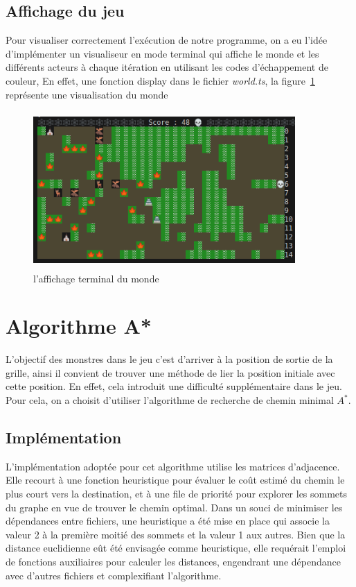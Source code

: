 \documentclass[11pt]{article}
\begin{document}
        \subsection{Affichage du jeu} 
    Pour visualiser correctement l’exécution de notre programme, on a eu l’idée d’implémenter un visualiseur en mode terminal qui affiche le monde et les différents acteurs à chaque itération en utilisant les codes d'échappement de couleur, En effet, une fonction display dans le fichier \textit{world.ts}, la figure~\ref{fig: display } représente une visualisation du monde \\
     \begin{figure}[h]
                \centering
                \includegraphics[height = 6cm, width = 10cm]{WorldFigure.png}
                \caption{l'affichage terminal du monde} 
                \label{fig: display } 
            \end{figure}
    \section{Algorithme A*}
        L'objectif des monstres dans le jeu c'est d'arriver à la position de sortie de la grille, ainsi il convient de trouver une méthode de lier la position initiale avec cette position. En effet, cela introduit une difficulté supplémentaire dans le jeu. Pour cela, on a choisit d'utiliser l'algorithme de recherche de chemin minimal $A^{*}$.
        \subsection{Implémentation}
            L'implémentation adoptée pour cet algorithme utilise les matrices d'adjacence. Elle recourt à une fonction heuristique pour évaluer le coût estimé du chemin le plus court vers la destination, et à une file de priorité pour explorer les sommets du graphe en vue de trouver le chemin optimal. Dans un souci de minimiser les dépendances entre fichiers, une heuristique a été mise en place qui associe la valeur 2 à la première moitié des sommets et la valeur 1 aux autres. Bien que la distance euclidienne eût été envisagée comme heuristique, elle requérait l'emploi de fonctions auxiliaires pour calculer les distances, engendrant une dépendance avec d'autres fichiers et complexifiant l'algorithme.
\end{document}

